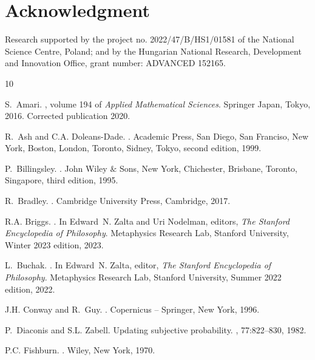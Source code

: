 \documentclass[10pt, letterpaper]{article}%
\theoremstyle{definition}
\newcommand{\1}{\mathbf 1}
\begin{document}
\section*{Acknowledgment}
Research supported by the project no. 2022/47/B/HS1/01581 of the National Science Centre, Poland; and by the Hungarian National Research, Development and Innovation Office, grant number: ADVANCED 152165.




\begin{thebibliography}{10}

S.~Amari.
, volume 194 of {\em
  Applied Mathematical Sciences}.
\newblock Springer Japan, Tokyo, 2016.
\newblock Corrected publication 2020.

R.~Ash and C.A. Doleans-Dade.
.
\newblock Academic Press, San Diego, San Franciso, New York, Boston, London,
  Toronto, Sidney, Tokyo, second edition, 1999.

P.~Billingsley.
.
\newblock John Wiley $\&$ Sons, New York, Chichester, Brisbane, Toronto,
  Singapore, third edition, 1995.

R.~Bradley.
.
\newblock Cambridge University Press, Cambridge, 2017.

R.A. Briggs.
.
\newblock In Edward~N. Zalta and Uri Nodelman, editors, {\em The {Stanford}
  Encyclopedia of Philosophy}. Metaphysics Research Lab, Stanford University,
  {W}inter 2023 edition, 2023.

L.~Buchak.
.
\newblock In Edward~N. Zalta, editor, {\em The {Stanford} Encyclopedia of
  Philosophy}. Metaphysics Research Lab, Stanford University, {S}ummer 2022
  edition, 2022.

J.H. Conway and R.~Guy.
.
\newblock Copernicus -- Springer, New York, 1996.

P.~Diaconis and S.L. Zabell.
\newblock Updating subjective probability.
, 77:822--830,
  1982.

P.C. Fishburn.
.
\newblock Wiley, New York, 1970.


\end{thebibliography}
\end{document}
